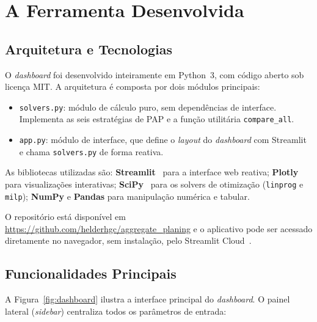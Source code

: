 \documentclass[a4paper,11pt]{article}
\begin{document}
\section{A Ferramenta Desenvolvida}
\label{sec:ferramenta}

\subsection{Arquitetura e Tecnologias}

O \textit{dashboard} foi desenvolvido inteiramente em Python~3, com código aberto sob
licença MIT. A arquitetura é composta por dois módulos principais:

\begin{itemize}
  \item \texttt{solvers.py}: módulo de cálculo puro, sem dependências de interface.
    Implementa as seis estratégias de PAP e a função utilitária \texttt{compare\_all}.
  \item \texttt{app.py}: módulo de interface, que define o \textit{layout} do
    \textit{dashboard} com Streamlit e chama \texttt{solvers.py} de forma reativa.
\end{itemize}

As bibliotecas utilizadas são: \textbf{Streamlit}~\citep{streamlit2024} para a interface
web reativa; \textbf{Plotly}~\citep{plotly2024} para visualizações interativas;
\textbf{SciPy}~\citep{scipy2020} para os solvers de otimização
(\texttt{linprog} e \texttt{milp}); \textbf{NumPy} e \textbf{Pandas} para manipulação
numérica e tabular.

O repositório está disponível em \url{https://github.com/helderhgc/aggregate_planing}
e o aplicativo pode ser acessado diretamente no navegador, sem instalação, pelo
Streamlit Cloud~\citep{github2026}.

\subsection{Funcionalidades Principais}

A Figura~\ref{fig:dashboard} ilustra a interface principal do \textit{dashboard}.
O painel lateral (\textit{sidebar}) centraliza todos os parâmetros de entrada:
\end{document}
